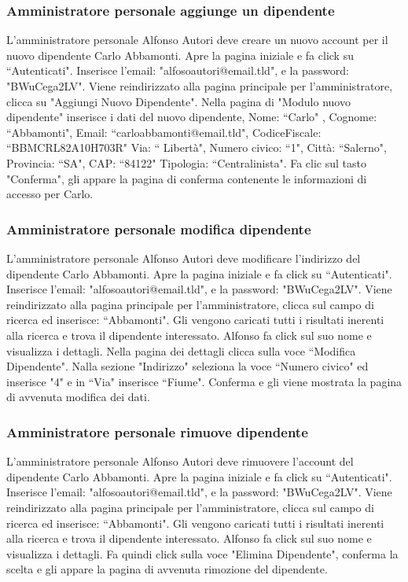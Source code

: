 \documentclass[12pt]{article}
\begin{document}
\subsubsection{Amministratore personale aggiunge un dipendente}
L'amministratore personale Alfonso Autori deve creare un nuovo account per il nuovo dipendente Carlo Abbamonti.
Apre la pagina iniziale e fa click su ``Autenticati".
Inserisce l'email: "alfosoautori@email.tld", e la password: "BWuCega2LV".
Viene reindirizzato alla pagina principale per l'amministratore, clicca su "Aggiungi Nuovo Dipendente".
Nella pagina di "Modulo nuovo dipendente" inserisce i dati del nuovo dipendente,
Nome: ``Carlo" , Cognome: ``Abbamonti", 
Email: ``carloabbamonti@email.tld",
CodiceFiscale: ``BBMCRL82A10H703R"
Via: `` Libertà", Numero civico: ``1", Città: ``Salerno", Provincia: ``SA", CAP: ``84122"
Tipologia: ``Centralinista".
Fa clic sul tasto "Conferma", gli appare la pagina di conferma contenente le informazioni di accesso per Carlo.

\subsubsection{Amministratore personale modifica dipendente}
L'amministratore personale Alfonso Autori deve modificare l'indirizzo del dipendente Carlo Abbamonti.
Apre la pagina iniziale e fa click su ``Autenticati".
Inserisce l'email: "alfosoautori@email.tld", e la password: "BWuCega2LV".
Viene reindirizzato alla pagina principale per l'amministratore, 
clicca sul campo di ricerca ed inserisce: ``Abbamonti".
Gli vengono caricati tutti i risultati inerenti alla ricerca e trova il dipendente interessato. Alfonso fa click sul suo nome e visualizza i dettagli.
Nella pagina dei dettagli clicca sulla voce ``Modifica Dipendente".
Nalla sezione "Indirizzo" seleziona la voce ``Numero civico" ed inserisce "4" e in ``Via" inserisce ``Fiume".
Conferma e gli viene mostrata la pagina di avvenuta modifica dei dati.

\subsubsection{Amministratore personale rimuove dipendente}
L'amministratore personale Alfonso Autori deve rimuovere l'account del dipendente Carlo Abbamonti.
Apre la pagina iniziale e fa click su ``Autenticati".
Inserisce l'email: "alfosoautori@email.tld", e la password: "BWuCega2LV".
Viene reindirizzato alla pagina principale per l'amministratore, 
clicca sul campo di ricerca ed inserisce: ``Abbamonti".
Gli vengono caricati tutti i risultati inerenti alla ricerca e trova il dipendente interessato. Alfonso fa click sul suo nome e visualizza i dettagli.
Fa quindi click sulla voce "Elimina Dipendente", conferma la scelta e gli appare la pagina di avvenuta rimozione del dipendente.
\end{document}
